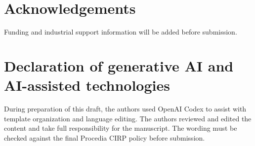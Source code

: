 \documentclass[5p,times,procedia]{elsarticle}
\begin{document}
\section*{Acknowledgements}
Funding and industrial support information will be added before submission.

\section*{Declaration of generative AI and AI-assisted technologies}
During preparation of this draft, the authors used OpenAI Codex to assist with template organization and language editing. The authors reviewed and edited the content and take full responsibility for the manuscript. The wording must be checked against the final Procedia CIRP policy before submission.



\end{document}
